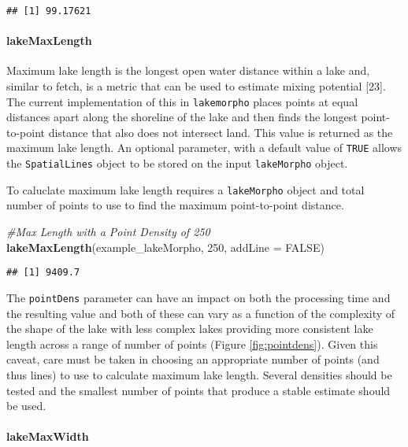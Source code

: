\documentclass[11pt,]{article}
\newenvironment{Shaded}{\begin{snugshade}}{\end{snugshade}}
\newcommand{\KeywordTok}[1]{\textcolor[rgb]{0.13,0.29,0.53}{\textbf{{#1}}}}
\newcommand{\DataTypeTok}[1]{\textcolor[rgb]{0.13,0.29,0.53}{{#1}}}
\newcommand{\DecValTok}[1]{\textcolor[rgb]{0.00,0.00,0.81}{{#1}}}
\newcommand{\CommentTok}[1]{\textcolor[rgb]{0.56,0.35,0.01}{\textit{{#1}}}}
\newcommand{\OtherTok}[1]{\textcolor[rgb]{0.56,0.35,0.01}{{#1}}}
\newcommand{\NormalTok}[1]{{#1}}
\begin{document}
\begin{verbatim}
## [1] 99.17621
\end{verbatim}

\paragraph{lakeMaxLength}\label{lakemaxlength}

Maximum lake length is the longest open water distance within a lake
and, similar to fetch, is a metric that can be used to estimate mixing
potential {[}23{]}. The current implementation of this in
\texttt{lakemorpho} places points at equal distances apart along the
shoreline of the lake and then finds the longest point-to-point distance
that also does not intersect land. This value is returned as the maximum
lake length. An optional parameter, with a default value of
\texttt{TRUE} allows the \texttt{SpatialLines} object to be stored on
the input \texttt{lakeMorpho} object.

To caluclate maximum lake length requires a \texttt{lakeMorpho} object
and total number of points to use to find the maximum point-to-point
distance.

\begin{Shaded}
\begin{Highlighting}[]
\CommentTok{#Max Length with a Point Density of 250}
\KeywordTok{lakeMaxLength}\NormalTok{(example_lakeMorpho, }\DecValTok{250}\NormalTok{, }\DataTypeTok{addLine =} \OtherTok{FALSE}\NormalTok{)}
\end{Highlighting}
\end{Shaded}

\begin{verbatim}
## [1] 9409.7
\end{verbatim}

The \texttt{pointDens} parameter can have an impact on both the
processing time and the resulting value and both of these can vary as a
function of the complexity of the shape of the lake with less complex
lakes providing more consistent lake length across a range of number of
points (Figure \ref{fig:pointdens}). Given this caveat, care must be
taken in choosing an appropriate number of points (and thus lines) to
use to calculate maximum lake length. Several densities should be tested
and the smallest number of points that produce a stable estimate should
be used.

\paragraph{lakeMaxWidth}\label{lakemaxwidth}
\end{document}
